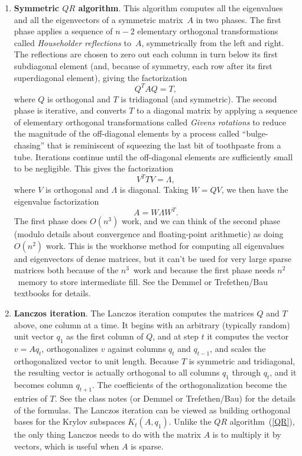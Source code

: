 \documentclass[11pt]{article}
\begin{document}
\begin{enumerate}
\item\label{QR}{\bf Symmetric $QR$ algorithm}.
This algorithm computes all the eigenvalues and all the eigenvectors
of a symmetric matrix~$A$ in two phases. 
The first phase applies a sequence of $n-2$ elementary orthogonal 
transformations called {\em Householder reflections} to~$A$,
symmetrically from the left and right.
The reflections are chosen to zero out each column in turn 
below its first subdiagonal element (and, because of symmetry,
each row after its first superdiagonal element), 
giving the factorization
$$Q^TAQ = T,$$
where $Q$ is orthogonal and $T$ is tridiagonal (and symmetric).
The second phase is iterative, and converts $T$ to a diagonal matrix
by applying a sequence of elementary orthogonal transformations called
{\em Givens rotations} to reduce the magnitude of the off-diagonal
elements by a process called ``bulge-chasing'' that is 
reminiscent of squeezing the last bit of toothpaste from a tube.
Iterations continue until the off-diagonal elements are sufficiently small
to be negligible.
This gives the factorization
$$V^TTV = \Lambda,$$
where $V$ is orthogonal and $\Lambda$ is diagonal.
Taking $W=QV$, we then have the eigenvalue factorization
$$A = W\Lambda W^T.$$
The first phase does $O(n^3)$ work, and we can think of the second phase
(modulo details about convergence and floating-point arithmetic)
as doing $O(n^2)$ work. 
This is the workhorse method for computing all eigenvalues and eigenvectors
of dense matrices, 
but it can't be used for very large sparse matrices
both because of the $n^3$~work and because the first phase 
needs $n^2$~memory to store intermediate fill.
See the Demmel or Trefethen/Bau textbooks for details.

\item{\bf Lanczos iteration}.
The Lanczos iteration computes the matrices $Q$ and $T$ above,
one column at a time.
It begins with an arbitrary (typically random)
unit vector $q_1$ as the first column
of $Q$, and at step $t$ it computes the vector $v=Aq_t$,
orthogonalizes $v$ against columns $q_t$ and $q_{t-1}$,
and scales the orthogonalized vector to unit length.
Because $T$ is symmetric and tridiagonal, 
the resulting vector is actually orthogonal to all columns $q_1$ 
through $q_t$, and it becomes column $q_{t+1}$.
The coefficients of the orthogonalization become the entries of $T$.
See the class notes (or Demmel or Trefethen/Bau) for the details
of the formulas.
The Lanczos iteration can be viewed as building orthogonal bases 
for the Krylov subspaces $K_t(A,q_1)$.
Unlike the $QR$ algorithm~(\ref{QR}),
the only thing Lanczos needs to do with
the matrix $A$ is to multiply it by vectors, 
which is useful when $A$ is sparse.


\end{enumerate}
\end{document}
